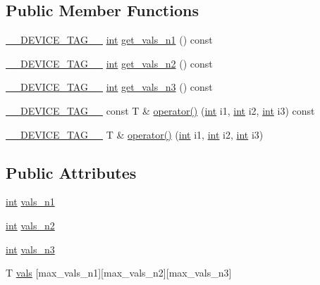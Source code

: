\subsection*{Public Member Functions}
\begin{DoxyCompactItemize}
\item 
\hyperlink{scalar__traits_8h_a2396f3e69fc9792ad01b8b14a1a425e3}{\-\_\-\-\_\-\-D\-E\-V\-I\-C\-E\-\_\-\-T\-A\-G\-\_\-\-\_\-} \hyperlink{classint}{int} \hyperlink{structutils_1_1vals__table__3d_a6375b9f4a451e62c7afc46a3cda7685c}{get\-\_\-vals\-\_\-n1} () const 
\item 
\hyperlink{scalar__traits_8h_a2396f3e69fc9792ad01b8b14a1a425e3}{\-\_\-\-\_\-\-D\-E\-V\-I\-C\-E\-\_\-\-T\-A\-G\-\_\-\-\_\-} \hyperlink{classint}{int} \hyperlink{structutils_1_1vals__table__3d_ad3f38c9f44917bc7eb51cb79e40e94da}{get\-\_\-vals\-\_\-n2} () const 
\item 
\hyperlink{scalar__traits_8h_a2396f3e69fc9792ad01b8b14a1a425e3}{\-\_\-\-\_\-\-D\-E\-V\-I\-C\-E\-\_\-\-T\-A\-G\-\_\-\-\_\-} \hyperlink{classint}{int} \hyperlink{structutils_1_1vals__table__3d_aa1eaaa90f00b246b5f44c5f30c6e9756}{get\-\_\-vals\-\_\-n3} () const 
\item 
\hyperlink{scalar__traits_8h_a2396f3e69fc9792ad01b8b14a1a425e3}{\-\_\-\-\_\-\-D\-E\-V\-I\-C\-E\-\_\-\-T\-A\-G\-\_\-\-\_\-} const T \& \hyperlink{structutils_1_1vals__table__3d_a4afaf17de7c9b93a53bed2b1a8bb1180}{operator()} (\hyperlink{classint}{int} i1, \hyperlink{classint}{int} i2, \hyperlink{classint}{int} i3) const 
\item 
\hyperlink{scalar__traits_8h_a2396f3e69fc9792ad01b8b14a1a425e3}{\-\_\-\-\_\-\-D\-E\-V\-I\-C\-E\-\_\-\-T\-A\-G\-\_\-\-\_\-} T \& \hyperlink{structutils_1_1vals__table__3d_abba4a6b1b8f125eb9f5117d74fb695bf}{operator()} (\hyperlink{classint}{int} i1, \hyperlink{classint}{int} i2, \hyperlink{classint}{int} i3)
\end{DoxyCompactItemize}
\subsection*{Public Attributes}
\begin{DoxyCompactItemize}
\item 
\hyperlink{classint}{int} \hyperlink{structutils_1_1vals__table__3d_ac51dcb829cf07eb6cb5c9aa6cb878925}{vals\-\_\-n1}
\item 
\hyperlink{classint}{int} \hyperlink{structutils_1_1vals__table__3d_a89e720206303e156855e120887633814}{vals\-\_\-n2}
\item 
\hyperlink{classint}{int} \hyperlink{structutils_1_1vals__table__3d_a7b637c7958c882759e6b8863793f4673}{vals\-\_\-n3}
\item 
T \hyperlink{structutils_1_1vals__table__3d_a5114626cc52e3fa8adc99cb8f3252f7c}{vals} \mbox{[}max\-\_\-vals\-\_\-n1\mbox{]}\mbox{[}max\-\_\-vals\-\_\-n2\mbox{]}\mbox{[}max\-\_\-vals\-\_\-n3\mbox{]}
\end{DoxyCompactItemize}



